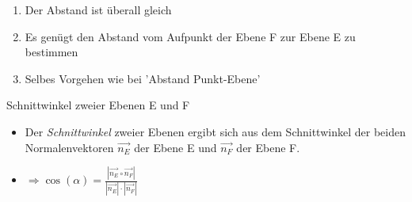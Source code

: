 \documentclass[paper=a6,ngerman,twoside=true,fontsize=14pt, parskip = half]{scrartcl}
\begin{document}
\begin{antwort} 
	\begin{enumerate} 
		\item Der Abstand ist überall gleich
		\item Es genügt den Abstand vom Aufpunkt der Ebene F zur Ebene E zu bestimmen
		\item Selbes Vorgehen wie bei 'Abstand Punkt-Ebene'	
	\end{enumerate} 
	
\end{antwort}
\begin{frage}
	Schnittwinkel zweier Ebenen E und F	
	
\end{frage}
\begin{antwort}
	
	\begin{itemize} 
		\item Der \emph{Schnittwinkel} zweier Ebenen ergibt sich aus dem Schnittwinkel der beiden Normalenvektoren $\vec{n_E}$ der Ebene E und $\vec{n_F}$ der Ebene F.  
		\item $\Rightarrow \cos(\alpha)=\frac{|\vec{n_E} \circ \vec{n_F}|}{|\vec{n_E}|\cdot|\vec{n_F}|}$
	\end{itemize} 	
\end{antwort}
\end{document}
